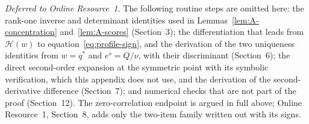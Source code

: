 \textit{Deferred to Online Resource~1.} The following routine steps are omitted here: the rank-one inverse and determinant identities used in Lemmas~\ref{lem:A-concentration} and~\ref{lem:A-scores} (Section~3); the differentiation that leads from $\mathcal H(w)$ to equation~\eqref{eq:profile-sign}, and the derivation of the two uniqueness identities from $w=q^*$ and $e^s=Q/\nu$, with their discriminant (Section~6); the direct second-order expansion at the symmetric point with its symbolic verification, which this appendix does not use, and the derivation of the second-derivative difference (Section~7); and numerical checks that are not part of the proof (Section~12). The zero-correlation endpoint is argued in full above; Online Resource~1, Section~8, adds only the two-item family written out with its signs.

